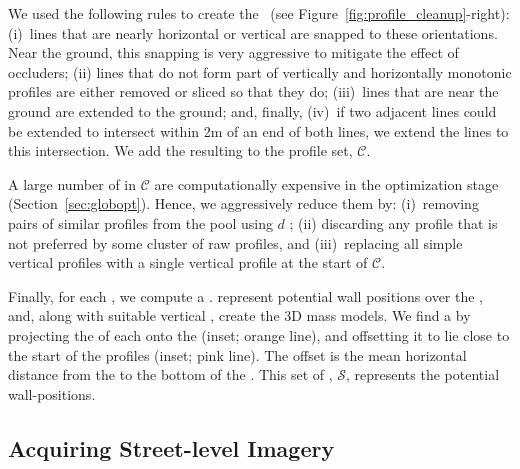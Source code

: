 We used the following rules to create the \cleanprofiles~(see Figure~\ref{fig:profile_cleanup}-right): %
(i)~lines that are nearly horizontal or vertical are snapped to these 
orientations. Near the ground, this snapping is very aggressive to mitigate the effect of occluders; 
(ii) lines that do not form part of vertically and horizontally monotonic profiles are either removed or sliced so that they do; 
(iii)~lines that are near the ground are extended to the ground; and, finally, 
(iv)~if two adjacent lines could be extended to intersect within 2m of an end of both lines, we extend the lines to this intersection.
%
We add the resulting \cleanprofile to the  profile set, $\mathcal{C}$.

A large number of \cleanprofiles in $\mathcal{C}$ are computationally expensive in the optimization stage (Section~\ref{sec:globopt}). Hence, we aggressively reduce them by: (i)~removing pairs of similar profiles from the pool using $d$ ; (ii) discarding any profile that is not preferred by some cluster of raw profiles, and (iii)~replacing all simple vertical profiles with a single vertical profile at the start of $\mathcal{C}$.


\begin{figure}
\vspace*{-.2in}
\hspace*{-.1in}
  \def\svgwidth{0.52\columnwidth}  
    
\end{figure}

Finally, for each \prominentface, we compute a \emph{\sweepedge}. \Sweepedges represent potential wall positions over the \groundplane, and, along with suitable vertical \cleanprofiles, create the 3D mass models.
We find a \sweepedge by projecting the \seedline of each \prominentface onto the \groundplane (inset; orange line), and offsetting it to lie close to the start of the profiles (inset; pink line).
The offset is the mean horizontal distance from the \seedline to the bottom of the \rawprofiles.
This set of \sweepedges, $\mathcal{S}$, represents the potential wall-positions.

\subsection{Acquiring Street-level Imagery}
\label{sec:acquiring-images}

